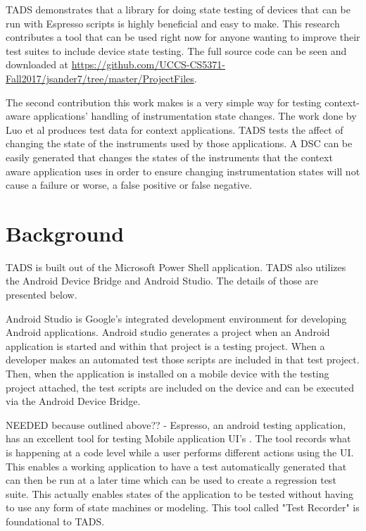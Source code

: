 TADS demonstrates that a library for doing state testing of devices that can be run with Espresso scripts is highly beneficial and easy to make.  This research contributes a tool that can be used right now for anyone wanting to improve their test suites to include device state testing. The full source code can be seen and downloaded at \url{https://github.com/UCCS-CS5371-Fall2017/jsander7/tree/master/ProjectFiles}.

The second contribution this work makes is a very simple way for testing context-aware applications' handling of instrumentation state changes. The work done by Luo et al \cite{Luo:2017:TLT:3139486.3130945} produces test data for context applications.  TADS tests the affect of changing the state of the instruments used by those applications.  A DSC can be easily generated that changes the states of the instruments that the context aware application uses in order to ensure changing instrumentation states will not cause a failure or worse, a false positive or false negative.

\section{Background}
TADS is built out of the Microsoft Power Shell application.  TADS also utilizes the Android Device Bridge and Android Studio.  The details of those are presented below.

Android Studio is Google's integrated development environment for developing Android applications.  Android studio generates a project when an Android application is started and within that project is a testing project.  When a developer makes an automated test those scripts are included in that test project.  Then, when the application is installed on a mobile device with the testing project attached, the test scripts are included on the device and can be executed via the Android Device Bridge.  

NEEDED because outlined above?? - Espresso, an android testing application, has an excellent tool for testing Mobile application UI's \cite{nolan2015agile}.  The tool records what is happening at a code level while a user performs different actions using the UI.  This enables a working application to have a test automatically generated that can then be run at a later time which can be used to create a regression test suite.  This actually enables states of the application to be tested without having to use any form of state machines or modeling.  This tool called "Test Recorder" is foundational to TADS. 

